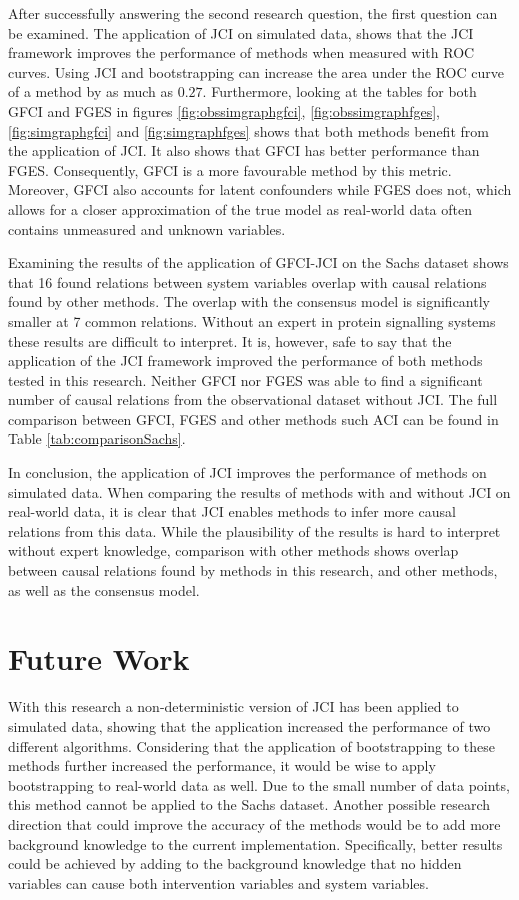 \documentclass[a4paper,pdf]{article}
\begin{document}
After successfully answering the second research question, the first question can be examined. The application of JCI on simulated data, shows that the JCI framework improves the performance of methods when measured with ROC curves. Using JCI and bootstrapping can increase the area under the ROC curve of a method by as much as $0.27$. Furthermore, looking at the tables for both GFCI and FGES in figures \ref{fig:obssimgraphgfci}, \ref{fig:obssimgraphfges}, \ref{fig:simgraphgfci} and \ref{fig:simgraphfges} shows that both methods benefit from the application of JCI. It also shows that GFCI has better performance than FGES. Consequently, GFCI is a more favourable method by this metric. Moreover, GFCI also accounts for latent confounders while FGES does not, which allows for a closer approximation of the true model as real-world data often contains unmeasured and unknown variables. 

Examining the results of the application of GFCI-JCI on the Sachs dataset shows that 16 found relations between system variables overlap with causal relations found by other methods. The overlap with the consensus model is significantly smaller at 7 common relations. Without an expert in protein signalling systems these results are difficult to interpret. It is, however, safe to say that the application of the JCI framework improved the performance of both methods tested in this research. Neither GFCI nor FGES was able to find a significant number of causal relations from the observational dataset without JCI. The full comparison between GFCI, FGES and other methods such ACI can be found in Table \ref{tab:comparisonSachs}.

In conclusion, the application of JCI improves the performance of methods on simulated data. When comparing the results of methods with and without JCI on real-world data, it is clear that JCI enables methods to infer more causal relations from this data. While the plausibility of the results is hard to interpret without expert knowledge, comparison with other methods shows overlap between causal relations found by methods in this research, and other methods, as well as the consensus model.

\section{Future Work}
With this research a non-deterministic version of JCI has been applied to simulated data, showing that the application increased the performance of two different algorithms. Considering that the application of bootstrapping to these methods further increased the performance, it would be wise to apply bootstrapping to real-world data as well. Due to the small number of data points, this method cannot be applied to the Sachs dataset. Another possible research direction that could improve the accuracy of the methods would be to add more background knowledge to the current implementation. Specifically, better results could be achieved by adding to the background knowledge that no hidden variables can cause both intervention variables and system variables. 
\end{document}
